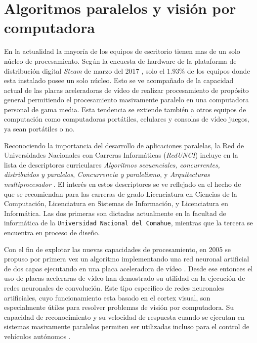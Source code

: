 
\section{Algoritmos paralelos y visión por computadora}

En la actualidad la mayoría de los equipos de escritorio tienen mas de un solo
núcleo de procesamiento. Según la encuesta de hardware de la plataforma de
distribución digital \emph{Steam} de marzo del 2017 \cite{steamSurvey}, solo
el $1.93$\% de los equipos donde esta instalado posee un solo núcleo. Esto se
ve acompañado de la capacidad actual de las placas aceleradoras de vídeo de
realizar procesamiento de propósito general permitiendo el procesamiento
masivamente paralelo en una computadora personal de gama media. Esta tendencia
se extiende también a otros equipos de computación como computadoras
portátiles, celulares y consolas de vídeo juegos, ya sean portátiles o no.

Reconociendo la importancia del desarrollo de aplicaciones paralelas, la Red
de Universidades Nacionales con Carreras Informáticas (\emph{RedUNCI}) incluye
en la lista de descriptores curriculares \emph{Algoritmos secuenciales,
concurrentes, distribuidos y paralelos}, \emph{Concurrencia y paralelismo}, y
\emph{Arquitecturas multiprocesador} \cite{RedUNCI2015}. El interés en estos
descriptores se ve reflejado en el hecho de que se recomiendan para las
carreras de grado Licenciatura en Ciencias de la Computación, Licenciatura en
Sistemas de Información, y Licenciatura en Informática. Las dos primeras son
dictadas actualmente en la facultad de informática de la \texttt{Universidad
Nacional del Comahue}, mientras que la tercera se encuentra en proceso de
diseño.

Con el fin de explotar las nuevas capacidades de procesamiento, en 2005 se
propuso por primera vez un algoritmo implementando una red neuronal artificial
de dos capas ejecutando en una placa aceleradora de vídeo \cite{GPUforMLA}.
Desde ese entonces el uso de placas aceleraras de vídeo han demostrado su
utilidad en la ejecución de redes neuronales de convolución. Este tipo
especifico de redes neuronales artificiales, cuyo funcionamiento esta basado en
el cortex visual, son especialmente útiles para resolver problemas de visión
por computadora. Su capacidad de reconocimiento y su velocidad de respuesta
cuando se ejecutan en sistemas masivamente paralelos permiten ser utilizadas
incluso para el control de vehículos autónomos \cite{e2eLearning4SDC}.
